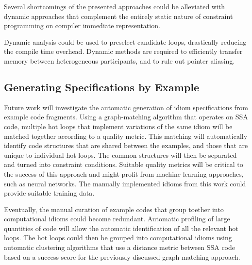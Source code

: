     Several shortcomings of the presented approaches could be alleviated with
    dynamic approaches that complement the entirely static nature of constraint
    programming on compiler immediate representation.

    Dynamic analysis could be used to preselect candidate loops, drastically
    reducing the compile time overhead.
    Dynamic methods are required to efficiently transfer memory between
    heterogeneous participants, and to rule out pointer aliasing.

\subsection*{Generating Specifications by Example}

    Future work will investigate the automatic generation of idiom
    specifications from example code fragments.
    Using a graph-matching algorithm that operates on SSA code, multiple hot
    loops that implement variations of the same idiom will be matched together
    according to a quality metric.
    This matching will automatically identify code structures that are shared
    between the examples, and those that are unique to individual hot loops.
    The common structures will then be separated and turned into constraint
    conditions.
    Suitable quality metrics will be critical to the success of this approach
    and might profit from machine learning approaches, such as neural networks.
    The manually implemented idioms from this work could provide suitable
    training data.

    Eventually, the manual curation of example codes that group toether into
    computational idioms could become redundant.
    Automatic profiling of large quantities of code will allow the automatic
    identification of all the relevant hot loops.
    The hot loops could then be grouped into computational idioms using
    automatic clustering algorithms that use a distance metric between SSA code
    based on a success score for the previously discussed graph matching
    approach.
